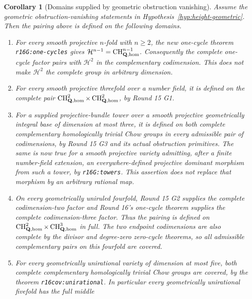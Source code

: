 \documentclass[11pt,a4paper]{article}
\newtheorem{corollary}[theorem]{Corollary}
\theoremstyle{definition}
\theoremstyle{remark}
\numberwithin{equation}{section}
\begin{document}
\begin{corollary}[Domains supplied by geometric obstruction vanishing]
\label{r16h:domains}
Assume the geometric obstruction-vanishing statements in Hypothesis~\ref{hyp:height-geometric}. Then the pairing above is defined on the following domains.
\begin{enumerate}
\item For every smooth projective $n$-fold with $n\geq2$, the new
      one-cycle theorem \texttt{r16G:one-cycles} gives
      $\mathcal H^{n-1}=\operatorname{CH}^{n-1}_{\mathbf Q,\rm hom}$.
      Consequently the complete one-cycle factor pairs with
      $\mathcal H^2$ in the complementary codimension. This does not
      make $\mathcal H^2$ the complete group in arbitrary dimension.
\item For every smooth projective threefold over a number field, it
      is defined on the complete pair
      $\operatorname{CH}^2_{\mathbf Q,\rm hom}\times
       \operatorname{CH}^2_{\mathbf Q,\rm hom}$, by Round 15 G1.
\item For a supplied projective-bundle tower over a smooth projective
      geometrically integral base of dimension at most three, it is
      defined on both complete complementary homologically trivial
      Chow groups in every admissible pair of codimensions, by
      Round 15 G3 and its actual obstruction primitives. The same is
      now true for a smooth projective variety admitting, after a
      finite number-field extension, an everywhere-defined projective
      dominant morphism from such a tower, by
      \texttt{r16G:towers}. This assertion does not replace that
      morphism by an arbitrary rational map.
\item On every geometrically uniruled fourfold, Round 15 G2 supplies
      the complete codimension-two factor and Round 16's one-cycle
      theorem supplies the complete codimension-three factor. Thus
      the pairing is defined on
      $\operatorname{CH}^2_{\mathbf Q,\rm hom}\times
       \operatorname{CH}^3_{\mathbf Q,\rm hom}$ in full. The two
      endpoint codimensions are also complete by the divisor
      and degree-zero zero-cycle theorems, so all admissible
      complementary pairs on this fourfold are covered.
\item For every geometrically unirational variety of dimension at
      most five, both complete complementary homologically trivial
      Chow groups are covered, by the theorem \texttt{r16cov:unirational}. In particular every
      geometrically unirational fivefold has the full middle

\end{enumerate}
\end{corollary}
\end{document}
